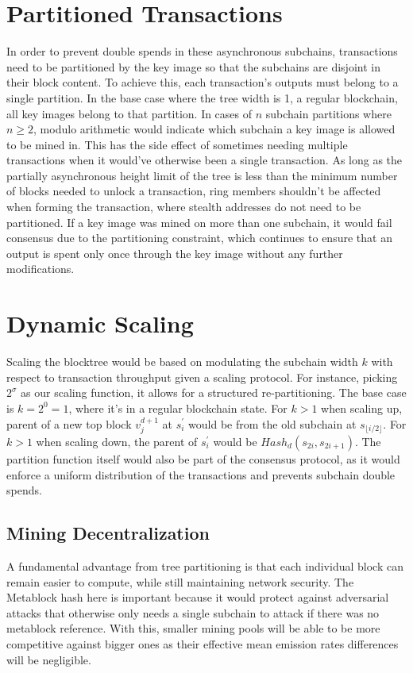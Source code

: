 \documentclass{article}
\begin{document}
\section{Partitioned Transactions}
In order to prevent double spends in these asynchronous subchains, transactions need to be partitioned by the key image so that the subchains are disjoint in their block content. To achieve this, each transaction's outputs must belong to a single partition. In the base case where the tree width is 1, a regular blockchain, all key images belong to that partition. In cases of $n$ subchain partitions where $n \geq 2$, modulo arithmetic would indicate which subchain a key image is allowed to be mined in. This has the side effect of sometimes needing multiple transactions when it would've otherwise been a single transaction. As long as the partially asynchronous height limit of the tree is less than the minimum number of blocks needed to unlock a transaction, ring members shouldn't be affected when forming the transaction, where stealth addresses do not need to be partitioned. If a key image was mined on more than one subchain, it would fail consensus due to the partitioning constraint, which continues to ensure that an output is spent only once through the key image without any further modifications.
\section{Dynamic Scaling}
Scaling the blocktree would be based on modulating the subchain width $k$ with respect to transaction throughput given a scaling protocol. For instance, picking $2^\sigma$ as our scaling function, it allows for a structured re-partitioning. The base case is $k = 2^0 = 1$, where it's in a regular blockchain state. For $k > 1$ when scaling up, parent of a new top block $v_j^{d+1}$ at $s_i^\prime$ would be from the old subchain at $s_{\lfloor i / 2\rfloor}$. For $k > 1$ when scaling down, the parent of $s_i^\prime$ would be $Hash_d(s_{2i}, s_{2i + 1})$. The partition function itself would also be part of the consensus protocol, as it would enforce a uniform distribution of the transactions and prevents subchain double spends.
\subsection{Mining Decentralization}
A fundamental advantage from tree partitioning is that each individual block can remain easier to compute, while still maintaining network security. The Metablock hash here is important because it would protect against adversarial attacks that otherwise only needs a single subchain to attack if there was no metablock reference. With this, smaller mining pools will be able to be more competitive against bigger ones as their effective mean emission rates differences will be negligible.
\end{document}
